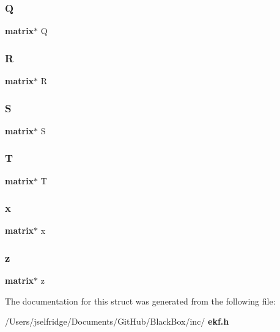 \subsubsection{Q}
{\footnotesize\ttfamily \textbf{ matrix}$\ast$ Q}

\mbox{\label{structekf__struct_a6ae37e393bb2233281a3da70cb8563fb}} 
\subsubsection{R}
{\footnotesize\ttfamily \textbf{ matrix}$\ast$ R}

\mbox{\label{structekf__struct_aebfdc653d5a534a4714f6caaf69f47ea}} 
\subsubsection{S}
{\footnotesize\ttfamily \textbf{ matrix}$\ast$ S}

\mbox{\label{structekf__struct_ae40b6b31a931e67f4d1fb4b8ac7ed41f}} 
\subsubsection{T}
{\footnotesize\ttfamily \textbf{ matrix}$\ast$ T}

\mbox{\label{structekf__struct_a1575b2fa39ca24947e0c619fc6285b77}} 
\subsubsection{x}
{\footnotesize\ttfamily \textbf{ matrix}$\ast$ x}

\mbox{\label{structekf__struct_a840058b5c67561185c94da497d0d3da6}} 
\subsubsection{z}
{\footnotesize\ttfamily \textbf{ matrix}$\ast$ z}



The documentation for this struct was generated from the following file\+:\begin{DoxyCompactItemize}
\item 
/\+Users/jselfridge/\+Documents/\+Git\+Hub/\+Black\+Box/inc/\textbf{ ekf.\+h}\end{DoxyCompactItemize}
